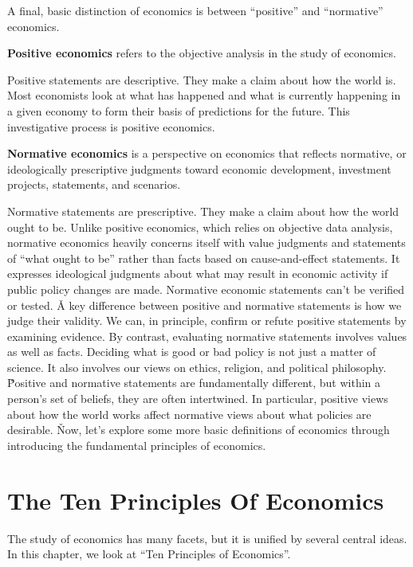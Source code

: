 A final, basic distinction of economics is between ``positive'' and ``normative'' economics.

\textbf{Positive economics} refers to the objective analysis in the study of economics.
\ed

Positive statements are descriptive. They make a claim about how the world is. Most economists look at what has
happened and what is currently happening in a given economy to form their basis of predictions for the future. This
investigative process is positive economics.

\textbf{Normative economics} is a perspective on economics that reflects normative, or ideologically prescriptive
judgments toward economic development, investment projects, statements, and scenarios.
\ed

Normative statements are prescriptive. They make a claim about how the world ought to be. Unlike positive economics,
which relies on objective data analysis, normative economics heavily concerns itself with value judgments and
statements of ``what ought to be'' rather than facts based on cause-and-effect statements. It expresses ideological
judgments about what may result in economic activity if public policy changes are made. Normative economic statements
can't be verified or tested. \v

A key difference between positive and normative statements is how we judge their validity. We can, in principle,
confirm or refute positive statements by examining evidence. By contrast, evaluating normative statements involves
values as well as facts. Deciding what is good or bad policy is not just a matter of science. It also involves our
views on ethics, religion, and political philosophy. \v

Positive and normative statements are fundamentally different, but within a person's set of beliefs, they are often
intertwined. In particular, positive views about how the world works affect normative views about what policies are
desirable. \v

Now, let's explore some more basic definitions of economics through introducing the fundamental principles of economics.

\section{The Ten Principles Of Economics}

The study of economics has many facets, but it is unified by several central ideas. In this chapter, we look at ``Ten
Principles of Economics''.

